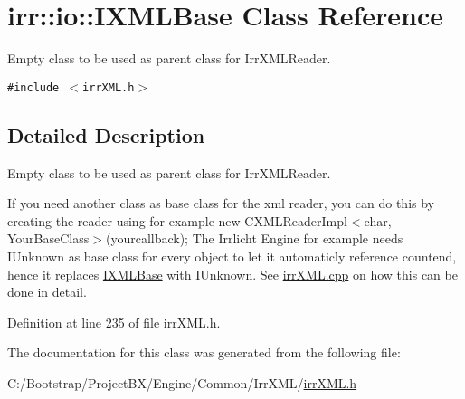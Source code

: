 \hypertarget{classirr_1_1io_1_1_i_x_m_l_base}{
\section{irr::io::IXMLBase Class Reference}
\label{classirr_1_1io_1_1_i_x_m_l_base}
}
Empty class to be used as parent class for IrrXMLReader.  


{\tt \#include $<$irrXML.h$>$}



\subsection{Detailed Description}
Empty class to be used as parent class for IrrXMLReader. 

If you need another class as base class for the xml reader, you can do this by creating the reader using for example new CXMLReaderImpl$<$char, YourBaseClass$>$(yourcallback); The Irrlicht Engine for example needs IUnknown as base class for every object to let it automaticly reference countend, hence it replaces \hyperlink{classirr_1_1io_1_1_i_x_m_l_base}{IXMLBase} with IUnknown. See \hyperlink{irr_x_m_l_8cpp}{irrXML.cpp} on how this can be done in detail. 

Definition at line 235 of file irrXML.h.

The documentation for this class was generated from the following file:\begin{CompactItemize}
\item 
C:/Bootstrap/ProjectBX/Engine/Common/IrrXML/\hyperlink{irr_x_m_l_8h}{irrXML.h}\end{CompactItemize}
